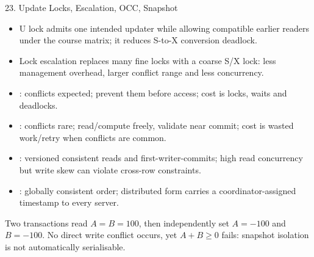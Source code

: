 \begin{topic}{23. Update Locks, Escalation, OCC, Snapshot}
\begin{itemize}
  \item U lock admits one intended updater while allowing compatible earlier readers under the course matrix; it reduces S-to-X conversion deadlock.
  \item Lock escalation replaces many fine locks with a coarse S/X lock: less management overhead, larger conflict range and less concurrency.
  \item {}: conflicts expected; prevent them before access; cost is locks, waits and deadlocks.
  \item {}: conflicts rare; read/compute freely, validate near commit; cost is wasted work/retry when conflicts are common.
  \item {}: versioned consistent reads and first-writer-commits; high read concurrency but write skew can violate cross-row constraints.
  \item {}: globally consistent order; distributed form carries a coordinator-assigned timestamp to every server.
\end{itemize}
\worked Two transactions read \(A=B=100\), then independently set \(A=-100\) and \(B=-100\). No direct write conflict occurs, yet \(A+B\ge0\) fails: snapshot isolation is not automatically serialisable.
\end{topic}

